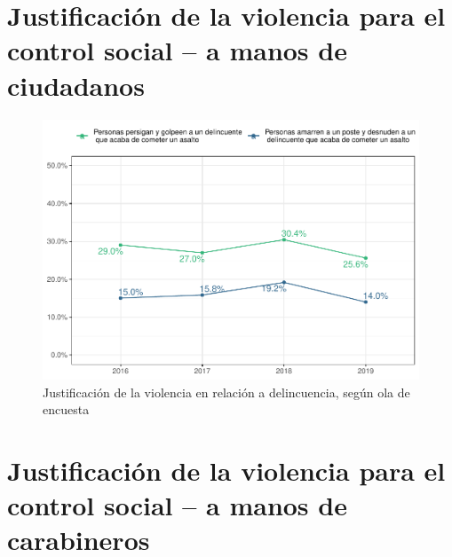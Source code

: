 \documentclass[
  12pt,
  openany]{book}
\begin{document}
\hypertarget{justificaciuxf3n-de-la-violencia-para-el-control-social-a-manos-de-ciudadanos}{%
\section{Justificación de la violencia para el control social -- a manos de ciudadanos}\label{justificaciuxf3n-de-la-violencia-para-el-control-social-a-manos-de-ciudadanos}}

\begin{figure}
\centering
\includegraphics{reporte-elsoc_files/figure-latex/just-vio-ola-1.pdf}
\caption{\label{fig:just-vio-ola}Justificación de la violencia en relación a delincuencia, según ola de encuesta}
\end{figure}

\hypertarget{justificaciuxf3n-de-la-violencia-para-el-control-social-a-manos-de-carabineros}{%
\section{Justificación de la violencia para el control social -- a manos de carabineros}\label{justificaciuxf3n-de-la-violencia-para-el-control-social-a-manos-de-carabineros}}
\end{document}
